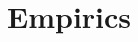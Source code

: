 \documentclass{article}
\theoremstyle{plain}
\theoremstyle{plain}
\begin{document}
\begin{comment}
Only task time durations fall in the short run.
If the firm does not redesign jobs wages remain unchanged as only human capital requirements of a job determines its wage.
Employment, however, will decline for some workers---those whose tasks are now completed faster than before by the help of AI.

If the firm redesigns jobs, wages and/or employment can potentially increase for some while decreasing for others.
Assuming no new tasks are created, redesigning jobs will move at least one task from one job to another.
Since wages are only determined by human capital requirements the wage of worker(s) being assigned new task(s) will increase whereas the wage of worker(s) whose task(s) are removed will fall.
While wages for some workers increases after a redesign, employment may not necessarily follow the same trend.
In particular, one can imagine a case where even despite a worker is assigned a new task in the redesigned job, the total time requirements of all their tasks still goes down.
Generally, if total time requirements of tasks within a job goes up, employment for that job will rise; otherwise, employment will fall.

If new tasks are introduced in the short run, depending on how they are allocated to jobs, wages could go up (if total human capital requirements increase) or down (if total human capital requirements decrease).
Similarly, employment could rise (if total time requirements increase) or fall (if total time requirements decrease).

\subsubsection{Long Run}  
Workers optimally invest in the updated skill set $\{\widetilde{\hccost{i}}\}$, yielding a new wage schedule. Depending on the new cost pairs $\bigl(\widetilde{\hccost{i}},\,\widetilde{\timecost{i}}\bigr)$, worker wages may rise, fall, or remain unchanged.
\end{comment}



\section{Empirics}
\end{document}
